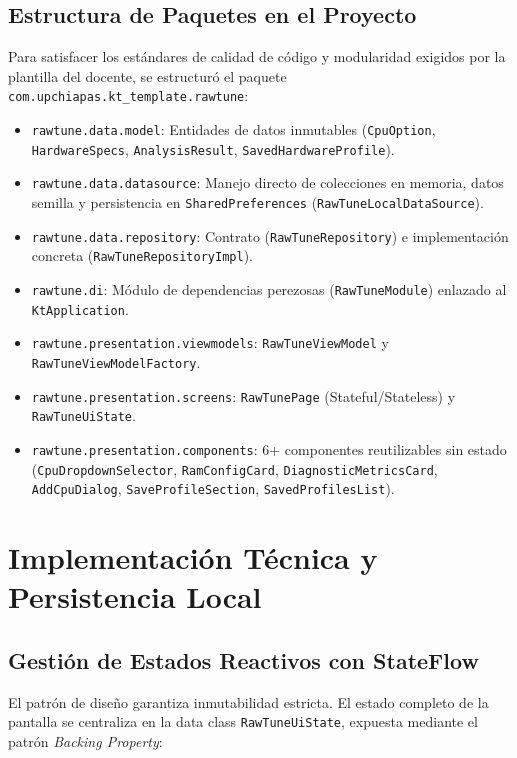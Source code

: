 \documentclass[12pt,a4paper]{article}
\begin{document}
\subsection{Estructura de Paquetes en el Proyecto}
Para satisfacer los estándares de calidad de código y modularidad exigidos por la plantilla del docente, se estructuró el paquete \texttt{com.upchiapas.kt\_template.rawtune}:

\begin{itemize}
    \item \texttt{rawtune.data.model}: Entidades de datos inmutables (\texttt{CpuOption}, \texttt{HardwareSpecs}, \texttt{AnalysisResult}, \texttt{SavedHardwareProfile}).
    \item \texttt{rawtune.data.datasource}: Manejo directo de colecciones en memoria, datos semilla y persistencia en \texttt{SharedPreferences} (\texttt{RawTuneLocalDataSource}).
    \item \texttt{rawtune.data.repository}: Contrato (\texttt{RawTuneRepository}) e implementación concreta (\texttt{RawTuneRepositoryImpl}).
    \item \texttt{rawtune.di}: Módulo de dependencias perezosas (\texttt{RawTuneModule}) enlazado al \texttt{KtApplication}.
    \item \texttt{rawtune.presentation.viewmodels}: \texttt{RawTuneViewModel} y \texttt{RawTuneViewModelFactory}.
    \item \texttt{rawtune.presentation.screens}: \texttt{RawTunePage} (Stateful/Stateless) y \texttt{RawTuneUiState}.
    \item \texttt{rawtune.presentation.components}: 6+ componentes reutilizables sin estado (\texttt{CpuDropdownSelector}, \texttt{RamConfigCard}, \texttt{DiagnosticMetricsCard}, \texttt{AddCpuDialog}, \texttt{SaveProfileSection}, \texttt{SavedProfilesList}).
\end{itemize}

\section{Implementación Técnica y Persistencia Local}

\subsection{Gestión de Estados Reactivos con StateFlow}
El patrón de diseño garantiza inmutabilidad estricta. El estado completo de la pantalla se centraliza en la data class \texttt{RawTuneUiState}, expuesta mediante el patrón \textit{Backing Property}:
\end{document}

